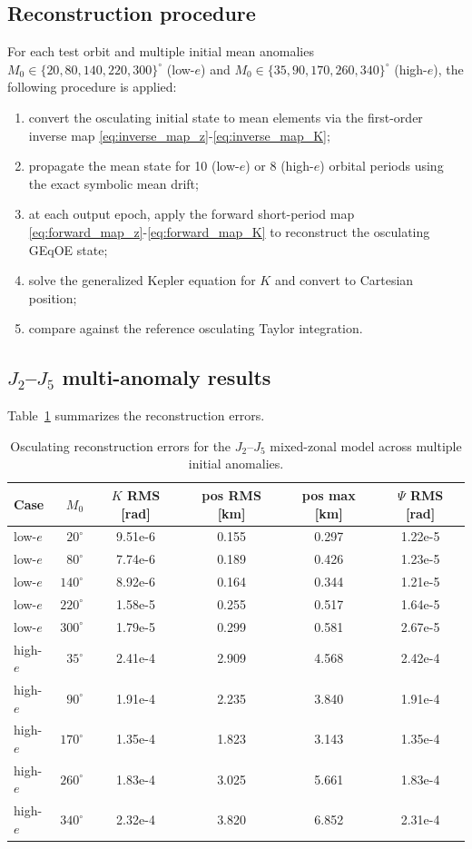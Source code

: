 \documentclass[11pt]{article}
\begin{document}
\subsection{Reconstruction procedure}

For each test orbit and multiple initial mean anomalies
$M_0 \in \{20, 80, 140, 220, 300\}^\circ$ (low-$e$) and
$M_0 \in \{35, 90, 170, 260, 340\}^\circ$ (high-$e$), the following
procedure is applied:
\begin{enumerate}
    \item convert the osculating initial state to mean elements via the
    first-order inverse map \eqref{eq:inverse_map_z}-\eqref{eq:inverse_map_K};
    \item propagate the mean state for 10 (low-$e$) or 8 (high-$e$) orbital
    periods using the exact symbolic mean drift;
    \item at each output epoch, apply the forward short-period map
    \eqref{eq:forward_map_z}-\eqref{eq:forward_map_K} to reconstruct the
    osculating GEqOE state;
    \item solve the generalized Kepler equation for $K$ and convert to
    Cartesian position;
    \item compare against the reference osculating Taylor integration.
\end{enumerate}

\subsection{$J_2$--$J_5$ multi-anomaly results}

Table~\ref{tab:j2j5_validation} summarizes the reconstruction errors.

\begin{table}[ht]
\centering
\begin{tabular}{@{}lrcccc@{}}
\toprule
Case & $M_0$ & $K$ RMS [rad] & pos RMS [km] & pos max [km] & $\Psi$ RMS [rad] \\
\midrule
low-$e$  & $20^\circ$  & 9.51e-6 & 0.155 & 0.297 & 1.22e-5 \\
low-$e$  & $80^\circ$  & 7.74e-6 & 0.189 & 0.426 & 1.23e-5 \\
low-$e$  & $140^\circ$ & 8.92e-6 & 0.164 & 0.344 & 1.21e-5 \\
low-$e$  & $220^\circ$ & 1.58e-5 & 0.255 & 0.517 & 1.64e-5 \\
low-$e$  & $300^\circ$ & 1.79e-5 & 0.299 & 0.581 & 2.67e-5 \\
high-$e$ & $35^\circ$  & 2.41e-4 & 2.909 & 4.568 & 2.42e-4 \\
high-$e$ & $90^\circ$  & 1.91e-4 & 2.235 & 3.840 & 1.91e-4 \\
high-$e$ & $170^\circ$ & 1.35e-4 & 1.823 & 3.143 & 1.35e-4 \\
high-$e$ & $260^\circ$ & 1.83e-4 & 3.025 & 5.661 & 1.83e-4 \\
high-$e$ & $340^\circ$ & 2.32e-4 & 3.820 & 6.852 & 2.31e-4 \\
\bottomrule
\end{tabular}
\caption{Osculating reconstruction errors for the $J_2$--$J_5$ mixed-zonal
model across multiple initial anomalies.}
\label{tab:j2j5_validation}
\end{table}
\end{document}
